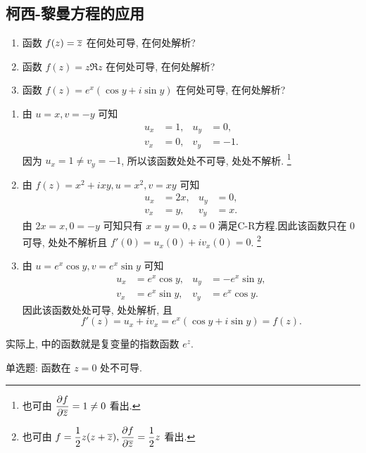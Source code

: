 \subsection{柯西-黎曼方程的应用}

\begin{example}
  \begin{enumerate}
    \item 函数 $f(z)=\overline z$ 在何处可导, 在何处解析?
    \item 函数 $f(z)=z\Re z$ 在何处可导, 在何处解析?
    \item 函数 $f(z)=e^x(\cos y+i\sin y)$ 在何处可导, 在何处解析?
  \end{enumerate}
\end{example}
\begin{solution}
  \begin{enumerate}
    \item 由 $u=x,v=-y$ 可知
      \begin{align*}
        u_x&=1,&u_y&=0,\\
        v_x&=0,&v_y&=-1.
      \end{align*}
    因为 $u_x=1\neq v_y=-1$, 所以该函数处处不可导, 处处不解析.
    \footnote{也可由 $\dfrac{\partial f}{\partial \overline z}=1\neq0$ 看出.}
    \item 由 $f(z)=x^2+ixy,u=x^2,v=xy$ 可知
      \begin{align*}
        u_x&=2x,&u_y&=0,\\
        v_x&=y, &v_y&=x.
      \end{align*}
    由 $2x=x,0=-y$ 可知只有 $x=y=0,z=0$ 满足C-R方程.因此该函数只在 $0$ 可导, 处处不解析且 $f'(0)=u_x(0)+iv_x(0)=0$.
    \footnote{也可由 $f=\dfrac12 z(z+\overline z), \dfrac{\partial f}{\partial \overline z}=\dfrac12 z$ 看出.}
    \item 由 $u=e^x\cos y,v=e^x\sin y$ 可知
      \begin{align*}
        u_x&=e^x\cos y,&u_y&=-e^x\sin y,\\
        v_x&=e^x\sin y,&v_y&=e^x\cos y.
      \end{align*}
    因此该函数处处可导, 处处解析, 且
      \[f'(z)=u_x+iv_x=e^x(\cos y+i\sin y)=f(z).\]
  \end{enumerate}
\end{solution}

实际上,  中的函数就是复变量的指数函数 $e^z$.

\begin{exercise}
	单选题: 函数\fillbrace{}在 $z=0$ 处不可导.
\end{exercise}

